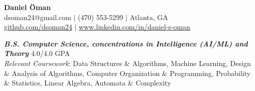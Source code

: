 \documentclass{article}
\begin{document}
\thispagestyle{empty}

\begin{center}
    \textbf{\LARGE Daniel Öman} \\
    dsoman24@gmail.com $|$ (470) 553-5299 $|$ Atlanta, GA \\
    \href{https://github.com/dsoman24}{github.com/dsoman24} $|$ \href{https://www.linkedin.com/in/daniel-s-oman/}{www.linkedin.com/in/daniel-s-oman}
\end{center}

\begin{flushleft}


{\textbf{\textit{B.S. Computer Science, concentrations in Intelligence (AI/ML) and Theory}} \hfill 4.0/4.0 GPA \\ \textit{Relevant Coursework}: Data Structures \& Algorithms, Machine Learning, Design \& Analysis of Algorithms, Computer Organization \& Programming, Probability \& Statistics, Linear Algebra, Automata \& Complexity}



\end{flushleft}
\end{document}
